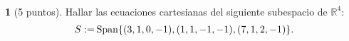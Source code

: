 \documentclass[12pt,a4paper]{report}
\theoremstyle{definition}
\newtheorem{ex}{}
\begin{document}
\newpage 
\hrulefill{}\\ 
\begin{ex}[5 puntos]   
Hallar las ecuaciones cartesianas del siguiente subespacio de $\mathbb{R}^4$: 
$$\begin{array}{c@{\hspace{2pt}}l}
S := & \operatorname{Span}\{(3, 1, 0, -1),(1, 1, -1, -1), (7, 1, 2, -1)\}.\\[+2pt]
\end{array}$$
\end{ex}
\end{document}

